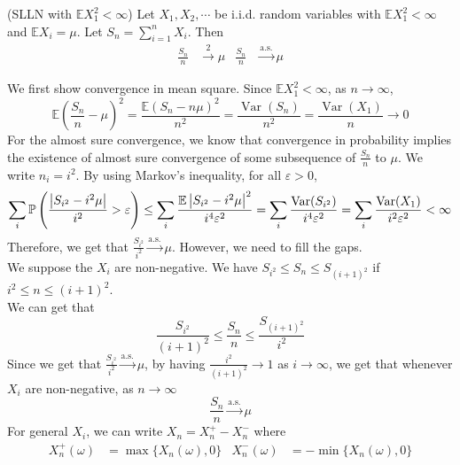 \documentclass{huhtakm-template-book}
\newcommand{\prob}{\mathbb{P}}
\newcommand{\expect}{\mathbb{E}}
\DeclareMathOperator{\Var}{Var}
\begin{document}
\begin{thm}(SLLN with $\expect X_{1}^{2}<\infty$) Let $X_{1},X_{2},\cdots$ be i.i.d. random variables with $\expect X_{1}^{2}<\infty$ and $\expect X_{i}=\mu$. Let $S_{n}=\sum_{i=1}^{n}X_{i}$. Then
	\begin{align*}
		\frac{S_{n}}{n}&\xrightarrow{2}\mu & \frac{S_{n}}{n}&\xrightarrow{\text{a.s.}}\mu
	\end{align*}
\end{thm}
\begin{proofing}
	We first show convergence in mean square. Since $\expect X_{1}^{2}<\infty$, as $n\to\infty$,
	\begin{equation*}
		\expect\left(\frac{S_{n}}{n}-\mu\right)^{2}=\frac{\expect(S_{n}-n\mu)^{2}}{n^{2}}=\frac{\Var(S_{n})}{n^{2}}=\frac{\Var(X_{1})}{n}\to 0
	\end{equation*}
	For the almost sure convergence, we know that convergence in probability implies the existence of almost sure convergence of some subsequence of $\frac{S_{n}}{n}$ to $\mu$. We write $n_{i}=i^{2}$. By using Markov's inequality, for all $\varepsilon>0$,
	\begin{equation*}
		\sum_{i}\prob\left(\frac{\abs{S_{i^{2}}-i^{2}\mu}}{i^{2}}>\varepsilon\right)\leq\sum_{i}\frac{\expect\abs{S_{i^{2}}-i^{2}\mu}^{2}}{i^{4}\varepsilon^{2}}=\sum_{i}\frac{\Var(S_{i^{2}})}{i^{4}\varepsilon^{2}}=\sum_{i}\frac{\Var(X_{1})}{i^{2}\varepsilon^{2}}<\infty
	\end{equation*}
	Therefore, we get that $\frac{S_{i^{2}}}{i^{2}}\xrightarrow{\text{a.s.}}\mu$. However, we need to fill the gaps.\\
	We suppose the $X_{i}$ are non-negative. We have $S_{i^{2}}\leq S_{n}\leq S_{(i+1)^{2}}$ if $i^{2}\leq n\leq (i+1)^{2}$.\\
	We can get that
	\begin{equation*}
		\frac{S_{i^{2}}}{(i+1)^{2}}\leq\frac{S_{n}}{n}\leq\frac{S_{(i+1)^{2}}}{i^{2}}
	\end{equation*}
	Since we get that $\frac{S_{i^{2}}}{i^{2}}\xrightarrow{\text{a.s.}}\mu$, by having $\frac{i^{2}}{(i+1)^{2}}\to 1$ as $i\to\infty$, we get that whenever $X_{i}$ are non-negative, as $n\to\infty$
	\begin{equation*}
		\frac{S_{n}}{n}\xrightarrow{\text{a.s.}}\mu
	\end{equation*}
	For general $X_{i}$, we can write $X_{n}=X_{n}^{+}-X_{n}^{-}$ where
	\begin{align*}
		X_{n}^{+}(\omega)&=\max\{X_{n}(\omega),0\} & X_{n}^{-}(\omega)&=-\min\{X_{n}(\omega),0\}

\end{align*}
\end{proofing}
\end{document}
